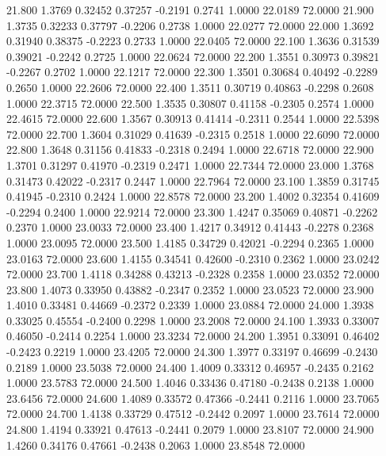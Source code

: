   21.800   1.3769   0.32452   0.37257  -0.2191   0.2741   1.0000  22.0189  72.0000
  21.900   1.3735   0.32233   0.37797  -0.2206   0.2738   1.0000  22.0277  72.0000
  22.000   1.3692   0.31940   0.38375  -0.2223   0.2733   1.0000  22.0405  72.0000
  22.100   1.3636   0.31539   0.39021  -0.2242   0.2725   1.0000  22.0624  72.0000
  22.200   1.3551   0.30973   0.39821  -0.2267   0.2702   1.0000  22.1217  72.0000
  22.300   1.3501   0.30684   0.40492  -0.2289   0.2650   1.0000  22.2606  72.0000
  22.400   1.3511   0.30719   0.40863  -0.2298   0.2608   1.0000  22.3715  72.0000
  22.500   1.3535   0.30807   0.41158  -0.2305   0.2574   1.0000  22.4615  72.0000
  22.600   1.3567   0.30913   0.41414  -0.2311   0.2544   1.0000  22.5398  72.0000
  22.700   1.3604   0.31029   0.41639  -0.2315   0.2518   1.0000  22.6090  72.0000
  22.800   1.3648   0.31156   0.41833  -0.2318   0.2494   1.0000  22.6718  72.0000
  22.900   1.3701   0.31297   0.41970  -0.2319   0.2471   1.0000  22.7344  72.0000
  23.000   1.3768   0.31473   0.42022  -0.2317   0.2447   1.0000  22.7964  72.0000
  23.100   1.3859   0.31745   0.41945  -0.2310   0.2424   1.0000  22.8578  72.0000
  23.200   1.4002   0.32354   0.41609  -0.2294   0.2400   1.0000  22.9214  72.0000
  23.300   1.4247   0.35069   0.40871  -0.2262   0.2370   1.0000  23.0033  72.0000
  23.400   1.4217   0.34912   0.41443  -0.2278   0.2368   1.0000  23.0095  72.0000
  23.500   1.4185   0.34729   0.42021  -0.2294   0.2365   1.0000  23.0163  72.0000
  23.600   1.4155   0.34541   0.42600  -0.2310   0.2362   1.0000  23.0242  72.0000
  23.700   1.4118   0.34288   0.43213  -0.2328   0.2358   1.0000  23.0352  72.0000
  23.800   1.4073   0.33950   0.43882  -0.2347   0.2352   1.0000  23.0523  72.0000
  23.900   1.4010   0.33481   0.44669  -0.2372   0.2339   1.0000  23.0884  72.0000
  24.000   1.3938   0.33025   0.45554  -0.2400   0.2298   1.0000  23.2008  72.0000
  24.100   1.3933   0.33007   0.46050  -0.2414   0.2254   1.0000  23.3234  72.0000
  24.200   1.3951   0.33091   0.46402  -0.2423   0.2219   1.0000  23.4205  72.0000
  24.300   1.3977   0.33197   0.46699  -0.2430   0.2189   1.0000  23.5038  72.0000
  24.400   1.4009   0.33312   0.46957  -0.2435   0.2162   1.0000  23.5783  72.0000
  24.500   1.4046   0.33436   0.47180  -0.2438   0.2138   1.0000  23.6456  72.0000
  24.600   1.4089   0.33572   0.47366  -0.2441   0.2116   1.0000  23.7065  72.0000
  24.700   1.4138   0.33729   0.47512  -0.2442   0.2097   1.0000  23.7614  72.0000
  24.800   1.4194   0.33921   0.47613  -0.2441   0.2079   1.0000  23.8107  72.0000
  24.900   1.4260   0.34176   0.47661  -0.2438   0.2063   1.0000  23.8548  72.0000
